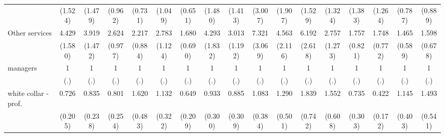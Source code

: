 {\begin{tabular}{l*{16}{c}}
                    &     (1.524)         &     (1.479)         &     (0.962)         &     (0.731)         &     (1.049)         &     (0.651)         &     (1.480)         &     (1.413)         &     (3.007)         &     (1.907)         &     (1.529)         &     (1.324)         &     (1.383)         &     (1.264)         &     (0.787)         &     (0.889)         \\
[1em]
Other services      &       4.429\sym{***}&       3.919\sym{***}&       2.624\sym{**} &       2.217\sym{*}  &       2.783\sym{*}  &       1.680         &       4.293\sym{***}&       3.013\sym{**} &       7.321\sym{***}&       4.563\sym{**} &       6.192\sym{***}&       2.757\sym{*}  &       1.757         &       1.748         &       1.465         &       1.598         \\
                    &     (1.580)         &     (1.472)         &     (0.977)         &     (0.884)         &     (1.124)         &     (0.690)         &     (1.832)         &     (1.192)         &     (3.069)         &     (2.116)         &     (2.618)         &     (1.273)         &     (0.821)         &     (0.772)         &     (0.589)         &     (0.678)         \\
[1em]
managers            &           1         &           1         &           1         &           1         &           1         &           1         &           1         &           1         &           1         &           1         &           1         &           1         &           1         &           1         &           1         &           1         \\
                    &         (.)         &         (.)         &         (.)         &         (.)         &         (.)         &         (.)         &         (.)         &         (.)         &         (.)         &         (.)         &         (.)         &         (.)         &         (.)         &         (.)         &         (.)         &         (.)         \\
[1em]
white collar - prof.&       0.726         &       0.835         &       0.801         &       1.620         &       1.132         &       0.649         &       0.933         &       0.885         &       1.083         &       1.290         &       1.839         &       1.552         &       0.735         &       0.422\sym{*}  &       1.145         &       1.493         \\
                    &     (0.205)         &     (0.238)         &     (0.254)         &     (0.483)         &     (0.322)         &     (0.209)         &     (0.300)         &     (0.309)         &     (0.384)         &     (0.501)         &     (0.742)         &     (0.608)         &     (0.303)         &     (0.172)         &     (0.403)         &     (0.541)         \\

\end{tabular}}
